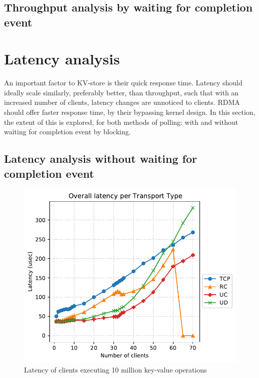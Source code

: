 \subsection{Throughput analysis by waiting for completion event}




\section{Latency analysis}\label{sec:latency:analysis}
An important factor to KV-store is their quick response time.
Latency should ideally scale similarly, preferably better, than throughput, such that with an increased number of clients, latency changes are unnoticed to clients.
RDMA should offer faster response time, by their bypassing kernel design.
In this section, the extent of this is explored, for both methods of polling: with and without waiting for completion event by blocking.

\subsection{Latency analysis without waiting for completion event}

\begin{figure}
    \centering
    \includegraphics[width=\columnwidth]{figures/PDF/Latency_avg_70}
    \caption{Latency of clients executing 10 million key-value operations}
    \label{fig:latency-70}
\end{figure}

